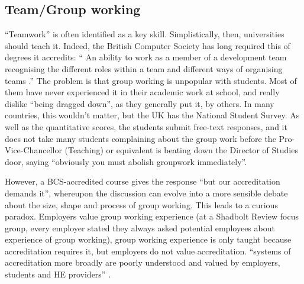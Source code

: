 \documentclass[sigconf]{acmart}
\begin{document}
\subsection{Team/Group working}

``Teamwork'' is often identified as a key skill. %
Simplistically, then, universities should teach it. Indeed, the British Computer Society has long required this
of degrees it accredits: ``%
An ability to work as a member of a development team
recognising the different roles within a team and different ways of
organising teams \cite[Requirement 2.3.1]{BCS2018a}.''
The problem is that group working is unpopular with students. Most of them have never experienced it in their academic work at school, and really dislike ``being dragged down'', as they generally put it, by others. In many countries, this wouldn't matter, but the UK has the National Student Survey.
As well as the quantitative scores, the students submit free-text responses, and it does not take many students complaining about the group work before the Pro-Vice-Chancellor (Teaching) or equivalent%
is beating down the Director of Studies door, saying ``obviously you must abolish groupwork immediately''. %

However, a BCS-accredited course gives the response ``but our
accreditation demands it'', whereupon the discussion can evolve into a
more sensible debate about the size, shape and process of group
working. This leads to a curious paradox. Employers value group
working experience (at a Shadbolt Review focus group, every employer
stated they always asked potential employees about experience of group
working), group working experience is only taught because
accreditation requires it, but employers do not value accreditation.
``systems of accreditation more broadly are poorly understood and
valued by employers, students and HE providers''
\cite[\P2.12]{Shadbolt2016a}.

\iffalse
\end{document}
